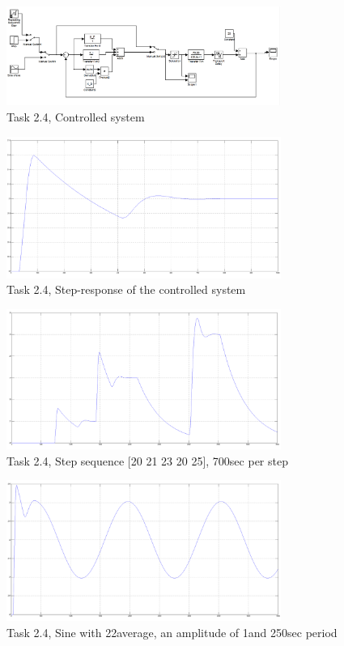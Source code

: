 \documentclass[12pt,a4paper,oneside]{article}
\begin{document}
\begin{enumerate}[a)]
  
\begin{figure}[htb]
  \centering
  \includegraphics[width=0.8\textwidth]{model.png}
  \caption{Task 2.4, Controlled system}
  \label{fig:heat}
\end{figure}
\begin{figure}[htb]
  \centering
  \includegraphics[width=0.8\textwidth]{result_sat.png}
  \caption{Task 2.4, Step-response of the controlled system}
  \label{fig:heat}
\end{figure}
\begin{figure}[htb]
  \centering
  \includegraphics[width=0.8\textwidth]{result_multistep_sat.png}
  \caption{Task 2.4, Step sequence [20 21 23 20 25], 700sec per step}
  \label{fig:heat}
\end{figure}
\begin{figure}[htb]
  \centering
  \includegraphics[width=0.8\textwidth]{result_sine_sat.png}
  \caption{Task 2.4, Sine with 22\textcelsius average, an amplitude of 1\textcelsius and 250sec period}
  \label{fig:heat}
\end{figure}
\end{enumerate}
\end{document}
